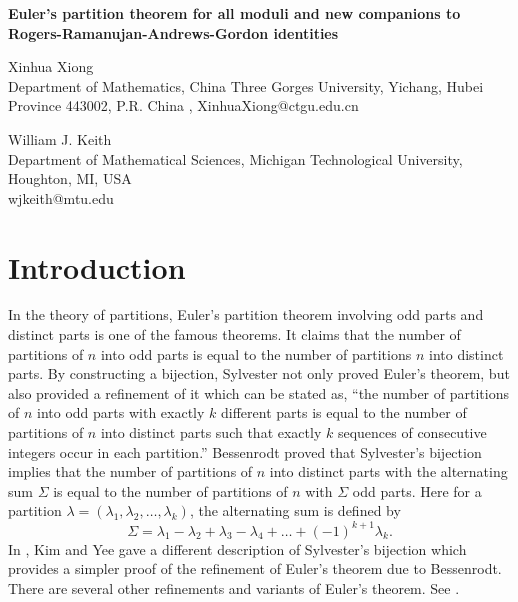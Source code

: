 \documentclass[11pt]{article}
\begin{document}
\begin{center}
{{\Large\bf Euler's partition theorem for all moduli and new companions to Rogers-Ramanujan-Andrews-Gordon identities}}

\vskip 6mm

\small{{ Xinhua Xiong
\\ Department of Mathematics,
China Three Gorges University, Yichang, Hubei Province  443002,
P.R. China ,
XinhuaXiong@ctgu.edu.cn 
}}

\small{
William J. Keith \\
              Department of Mathematical Sciences, Michigan Technological University,
Houghton, MI, USA\\
                     wjkeith@mtu.edu


}


\end{center}



\begin{abstract}
We extend Euler's partition theorem involving odd parts and distinct parts for all moduli and provide new companions to Rogers-Ramanujan-Andrews-Gordon identities related to this theorem.


\end{abstract}




\section{Introduction}
In the theory of partitions, Euler's partition theorem involving odd parts and distinct parts is one of the famous theorems. It claims that the number of partitions of $n$ into odd parts is equal to  the number of partitions $n$ into distinct parts. By constructing a bijection, Sylvester \cite{Syl82} not only proved Euler's theorem, but also provided a refinement of it which can be stated as, ``the number of partitions of $n$ into odd parts with exactly $k$ different parts is equal to the number of partitions of $n$ into distinct parts such that exactly $k$ sequences of consecutive integers occur in each partition.''  Bessenrodt  \cite{bes94} proved that Sylvester's bijection implies that the number of partitions of $n$ into distinct parts with the alternating sum $\Sigma$ is equal to the number of partitions of $n$ with $\Sigma$ odd parts. Here for a partition $\lambda=(\lambda_1,\lambda_2,\dots,\lambda_{k})$, the alternating sum is defined by 
\begin{equation}
\Sigma=\lambda_{1}-\lambda_{2}+\lambda_{3}-\lambda_{4}+\dots+(-1)^{k+1}\lambda_{k}.\label{alternating}
\end{equation}
 In \cite{Kim-Yee}, Kim and Yee gave a different description of Sylvester's bijection which provides a simpler proof of the refinement of Euler's theorem due to Bessenrodt. There are several other refinements and variants of Euler's theorem. See \cite{All3, AndrewsEuler, Ber1, Ber2, Ber3, chen, Pak, Yee2001,Yee2002}.
\end{document}
